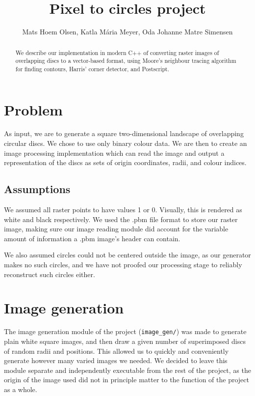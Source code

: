 \documentclass{article}
\title{Pixel to circles project}
\author{Mats Hoem Olsen, Katla Mária Meyer, Oda Johanne Matre Simensen}
\begin{document}
	\maketitle
	\tableofcontents
	\listofalgorithms
	\begin{abstract}
		We describe our implementation in modern C++ of converting raster images of overlapping discs to a vector-based format, using Moore's neighbour tracing algorithm for finding contours, Harris' corner detector, and Postscript\textsuperscript{\textregistered}. 
	\end{abstract}
	\newpage

	\section{Problem}
	As input, we are to generate a square two-dimensional landscape of overlapping circular discs. We chose to use only binary colour data. We are then to create an image processing implementation which can read the image and output a representation of the discs as sets of origin coordinates, radii, and colour indices.

	\subsection{Assumptions}
	We assumed all raster points to have values 1 or 0. Visually, this is rendered as white and black respectively. We used the .pbm file format\cite{pbm} to store our raster image, making sure our image reading module did account for the variable amount of information a .pbm image's header can contain.
	
	We also assumed circles could not be centered outside the image, as our generator makes no such circles, and we have not proofed our processing stage to reliably reconstruct such circles either.

	\section{Image generation}
	The image generation module of the project (\texttt{image\_gen/}) was made to generate plain white square images, and then draw a given number of superimposed discs of random radii and positions.
	This allowed us to quickly and conveniently generate however many varied images we needed.
	We decided to leave this module separate and independently executable from the rest of the project, as the origin of the image used did not in principle matter to the function of the project as a whole.
	
\end{document}
